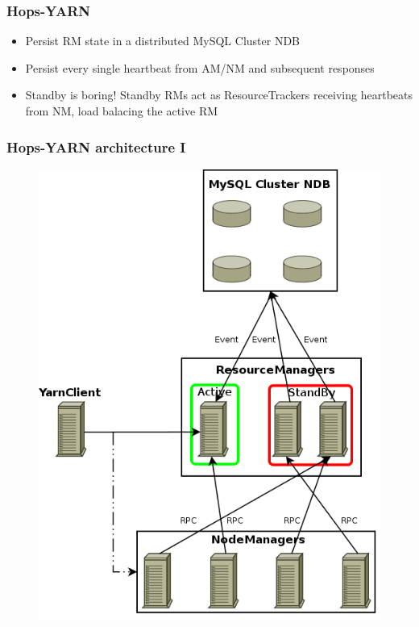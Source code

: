 \documentclass{beamer}
\begin{document}
\begin{frame}
\frametitle{Hops-YARN}

\begin{itemize}
\item Persist RM state in a distributed MySQL Cluster NDB

\item Persist every single heartbeat from AM/NM and subsequent responses

\item<2-> Standby is boring! Standby RMs act as ResourceTrackers
  receiving heartbeats from NM, load balacing the active RM
\end{itemize}
\end{frame}

\begin{frame}
\frametitle{Hops-YARN architecture I}

\begin{figure}
\centering
\includegraphics[scale=0.3]{resources/hopsyarn_arch_overview.png}
\end{figure}
\end{frame}
\end{document}
